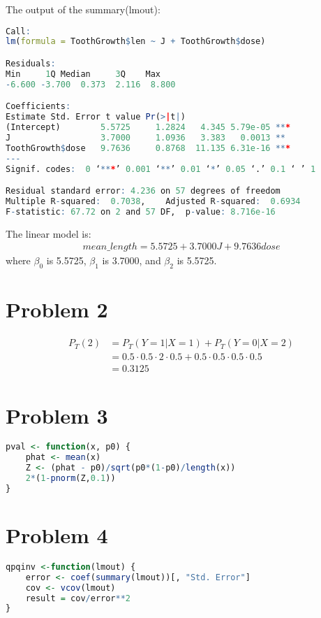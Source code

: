 \documentclass[11pt]{article}
\begin{document}
The output of the summary(lmout):
\begin{lstlisting}[language=R]
Call:
lm(formula = ToothGrowth$len ~ J + ToothGrowth$dose)

Residuals:
Min     1Q Median     3Q    Max 
-6.600 -3.700  0.373  2.116  8.800 

Coefficients:
Estimate Std. Error t value Pr(>|t|)    
(Intercept)        5.5725     1.2824   4.345 5.79e-05 ***
J                  3.7000     1.0936   3.383   0.0013 ** 
ToothGrowth$dose   9.7636     0.8768  11.135 6.31e-16 ***
---
Signif. codes:  0 ‘***’ 0.001 ‘**’ 0.01 ‘*’ 0.05 ‘.’ 0.1 ‘ ’ 1

Residual standard error: 4.236 on 57 degrees of freedom
Multiple R-squared:  0.7038,    Adjusted R-squared:  0.6934 
F-statistic: 67.72 on 2 and 57 DF,  p-value: 8.716e-16
\end{lstlisting}

The linear model is:
\begin{align*}
    mean\_length = 5.5725 + 3.7000 J + 9.7636 dose
\end{align*}
where $\beta_0$ is 5.5725, $\beta_1$ is 3.7000, and $\beta_2$ is 5.5725.

\section*{Problem 2}
\begin{align*}
    P_T(2) &= P_T(Y = 1|X = 1) + P_T(Y = 0|X = 2) \\
           &= 0.5 \cdot 0.5 \cdot 2 \cdot 0.5 + 0.5 \cdot 0.5 \cdot 0.5 \cdot 0.5\\
           &= 0.3125
\end{align*}

\section*{Problem 3}
\begin{lstlisting}[language=R]
pval <- function(x, p0) {
    phat <- mean(x)
    Z <- (phat - p0)/sqrt(p0*(1-p0)/length(x))
    2*(1-pnorm(Z,0.1))
}
\end{lstlisting}

\section*{Problem 4}
\begin{lstlisting}[language=R]
qpqinv <-function(lmout) {
    error <- coef(summary(lmout))[, "Std. Error"]
    cov <- vcov(lmout)
    result = cov/error**2
}
\end{lstlisting}
\end{document}
